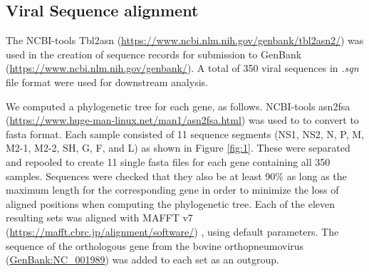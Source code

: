 \documentclass{article}
\begin{document}
\subsection{Viral Sequence alignment}
The NCBI-tools Tbl2asn (\url{https://www.ncbi.nlm.nih.gov/genbank/tbl2asn2/})
was used in the creation of sequence records for submission to GenBank (\url{https://www.ncbi.nlm.nih.gov/genbank/}).
A total of 350 viral sequences in \textit{.sqn} file format were used for downstream analysis.

We computed a phylogenetic tree for each gene, as follows.
NCBI-tools asn2fsa (\url{https://www.huge-man-linux.net/man1/asn2fsa.html}) was used to to convert to fasta format.
Each sample consisted of 11 sequence segments
(NS1, NS2, N, P, M, M2-1, M2-2, SH, G, F, and L) as shown in 
Figure \ref{fig:1}.
These were separated and repooled to create 11 single fasta files for each gene containing all 350 samples. 
Sequences were checked that they also be at least 90\% as long as the maximum length 
for the corresponding gene in order to minimize the loss of aligned positions when computing the phylogenetic tree. 
Each of the eleven resulting sets was aligned with MAFFT v7 (\url{https://mafft.cbrc.jp/alignment/software/})
\cite{katoh2013mafft},
using default  parameters.
The sequence of the orthologous gene from the bovine orthopneumovirus 
(\href{https://www.ncbi.nlm.nih.gov/nuccore/NC_001989}{GenBank:NC\_001989}) 
was added to each set as an outgroup. 
\end{document}
